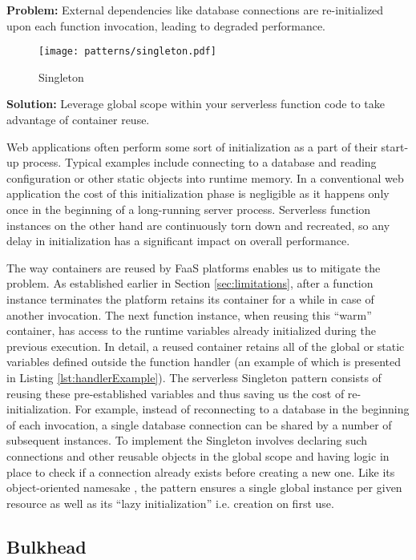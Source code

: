 \textbf{Problem:} External dependencies like database connections are re-initialized upon each function invocation, leading to degraded performance.

\begin{figure}[h]
  \centering
  \texttt{[image: patterns/singleton.pdf]}
  \caption{Singleton}
  \label{fig:singleton}
\end{figure}

\textbf{Solution:} Leverage global scope within your serverless function code to take advantage of container reuse.

Web applications often perform some sort of initialization as a part of their start-up process. Typical examples include connecting to a database and reading configuration or other static objects into runtime memory. In a conventional web application the cost of this initialization phase is negligible as it happens only once in the beginning of a long-running server process. Serverless function instances on the other hand are continuously torn down and recreated, so any delay in initialization has a significant impact on overall performance.

The way containers are reused by FaaS platforms enables us to mitigate the problem. As established earlier in Section \ref{sec:limitations}, after a function instance terminates the platform retains its container for a while in case of another invocation. The next function instance, when reusing this ``warm'' container, has access to the runtime variables already initialized during the previous execution. In detail, a reused container retains all of the global or static variables defined outside the function handler (an example of which is presented in Listing \ref{lst:handlerExample}). The serverless Singleton pattern consists of reusing these pre-established variables and thus saving us the cost of re-initialization. For example, instead of reconnecting to a database in the beginning of each invocation, a single database connection can be shared by a number of subsequent instances. To implement the Singleton involves declaring such connections and other reusable objects in the global scope and having logic in place to check if a connection already exists before creating a new one. Like its object-oriented namesake \parencite{gamma94designPatterns}, the pattern ensures a single global instance per given resource as well as its ``lazy initialization'' i.e. creation on first use. \parencite{aws18serverlessLens}

\subsection{Bulkhead} \label{subsec:Bulkhead}


